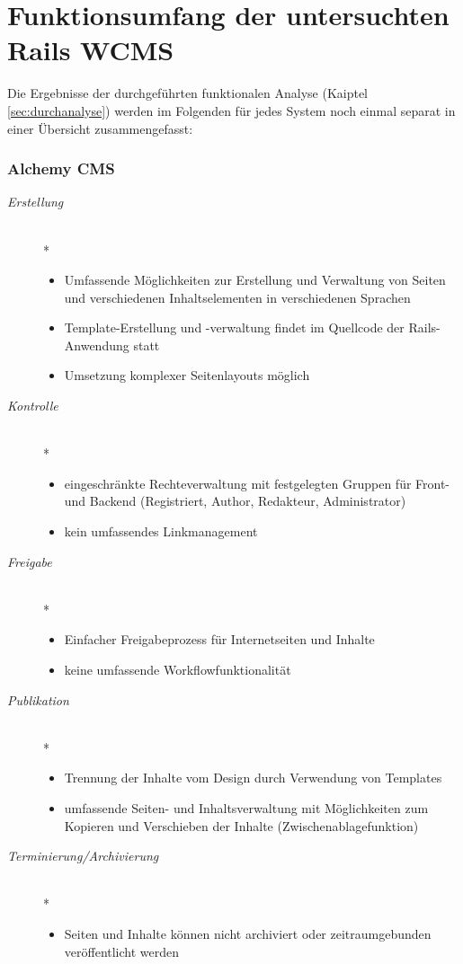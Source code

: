 \section{Funktionsumfang der untersuchten Rails WCMS}
Die Ergebnisse der durchgeführten funktionalen Analyse (Kaiptel \ref{sec:durchanalyse}) werden im Folgenden für jedes System noch einmal separat in einer Übersicht zusammengefasst:


\subsubsection{Alchemy CMS}

\begin{description}
\item[\emph{Erstellung}]\mbox{~}\\*
\begin{itemize}
	\item Umfassende Möglichkeiten zur Erstellung und Verwaltung von Seiten und verschiedenen Inhaltselementen in verschiedenen Sprachen
	\item Template-Erstellung und -verwaltung findet im Quellcode der Rails-Anwendung statt
	\item Umsetzung komplexer Seitenlayouts möglich
\end{itemize}
\item[\emph{Kontrolle}]\mbox{~}\\*
\begin{itemize}
	\item eingeschränkte Rechteverwaltung mit festgelegten Gruppen für Front- und Backend (Registriert, Author, Redakteur, Administrator)
	\item kein umfassendes Linkmanagement
\end{itemize}
\item[\emph{Freigabe}]\mbox{~}\\*
\begin{itemize}
	\item Einfacher Freigabeprozess für Internetseiten und Inhalte
	\item keine umfassende Workflowfunktionalität
\end{itemize}
\item[\emph{Publikation}]\mbox{~}\\*
\begin{itemize}
	\item Trennung der Inhalte vom Design durch Verwendung von Templates
	\item umfassende Seiten- und Inhaltsverwaltung mit Möglichkeiten zum Kopieren und Verschieben der Inhalte (Zwischenablagefunktion)
\end{itemize}
\item[\emph{Terminierung/Archivierung}]\mbox{~}\\*
\begin{itemize}
	\item Seiten und Inhalte können nicht archiviert oder zeitraumgebunden veröffentlicht werden
\end{itemize}
\end{description}

